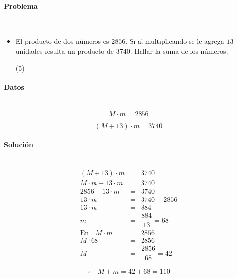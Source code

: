 \documentclass[12pt, a4paper]{article}
\begin{document}
\paragraph*{Problema} -- \\
\begin{itemize}
	\item{El producto de dos números es $2856$. Si al multiplicando se le agrega $13$ unidades resulta un producto de $3740$. Hallar la suma de los números.

	\begin{tasks}(5)
	\end{tasks}
	}
\end{itemize}
\paragraph*{Datos} -- \\

$$
M \cdot m = 2856 
$$

$$
(M + 13) \cdot m = 3740 
$$

\paragraph*{Solución} -- 
\begin{eqnarray*}
(M + 13) \cdot m &=& 3740 \\
M\cdot m + 13\cdot m &=& 3740 \\
2856 + 13 \cdot m &=& 3740  \\
13 \cdot m &=& 3740 - 2856 \\ 
13 \cdot m &=& 884 \\ 
m &=& \dfrac{884}{13} = 68\\
\text{En}\quad M \cdot m &=& 2856 \\
M \cdot 68 &=& 2856 \\
M &=& \dfrac{2856}{68} = 42
\end{eqnarray*}

$$
\therefore\quad M + m = 42 + 68 = 110
$$
\end{document}
